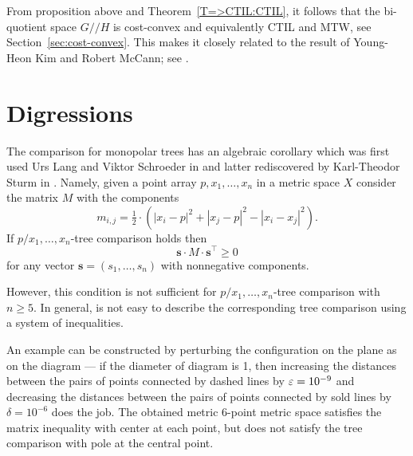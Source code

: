 From proposition above and Theorem~\ref{T=>CTIL:CTIL}, it follows that the bi-quotient space $G/\!\!/H$ is cost-convex and  equivalently CTIL and MTW, see Section~\ref{sec:cost-convex}.
This makes it closely related to the result of Young-Heon Kim and Robert McCann; see  \cite{kim-mccann}.

\section{Digressions}

The comparison for monopolar trees has an algebraic corollary which was first used Urs Lang and Viktor Schroeder in \cite{LS} and latter rediscovered by Karl-Theodor Sturm in \cite{sturm}. 
Namely, given a point array $p,x_1,\dots,x_n$ in a metric space $X$ consider the matrix $M$ with the components 
\[m_{i,j}=\tfrac12\cdot(|x_i-p|^2+|x_j-p|^2-|x_i-x_j|^2).\]
If $p/x_1,\dots,x_n$-tree comparison holds then 
\[\bm{s}\cdot M\cdot \bm{s}^\top\ge 0\]
for any vector $\bm{s}=(s_1,\dots,s_n)$ with nonnegative components.

\hide
\begin{wrapfigure}{r}{21 mm}
\end{wrapfigure}

However, this condition is not sufficient for $p/x_1,\dots,x_n$-tree comparison with $n\ge 5$.
In general, is not easy to describe the corresponding tree comparison using a system of inequalities.

An example can be constructed by perturbing the configuration on the plane as on the diagram ---
if the diameter of diagram is 1, 
then increasing the distances between the pairs of points connected by dashed lines by $\varepsilon=10^{-9}$ and decreasing  the distances between the pairs of points connected by sold lines by $\delta=10^{-6}$ does the job.
The obtained metric 6-point metric space satisfies the matrix inequality with center at each point, but does not satisfy the tree comparison with pole at the central point.


